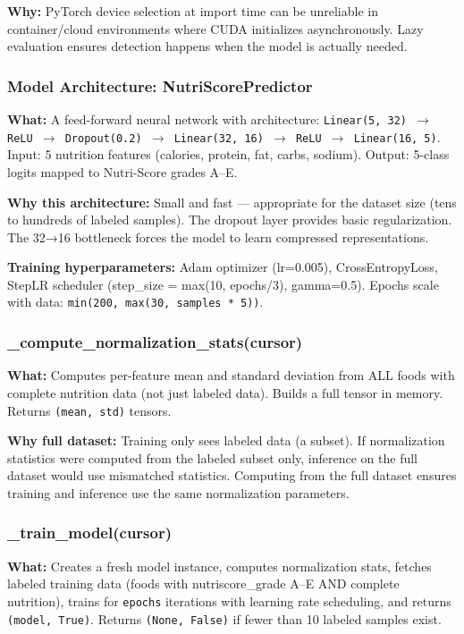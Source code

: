 \documentclass[12pt,a4paper]{article}
\begin{document}
\textbf{Why:} PyTorch device selection at import time can be unreliable in container/cloud environments where CUDA initializes asynchronously. Lazy evaluation ensures detection happens when the model is actually needed.

\subsubsection{Model Architecture: NutriScorePredictor}
\textbf{What:} A feed-forward neural network with architecture: \texttt{Linear(5, 32) $\rightarrow$ ReLU $\rightarrow$ Dropout(0.2) $\rightarrow$ Linear(32, 16) $\rightarrow$ ReLU $\rightarrow$ Linear(16, 5)}. Input: 5 nutrition features (calories, protein, fat, carbs, sodium). Output: 5-class logits mapped to Nutri-Score grades A–E.

\textbf{Why this architecture:} Small and fast — appropriate for the dataset size (tens to hundreds of labeled samples). The dropout layer provides basic regularization. The 32→16 bottleneck forces the model to learn compressed representations.

\textbf{Training hyperparameters:} Adam optimizer (lr=0.005), CrossEntropyLoss, StepLR scheduler (step\_size = max(10, epochs/3), gamma=0.5). Epochs scale with data: \texttt{min(200, max(30, samples * 5))}.

\subsubsection{\_compute\_normalization\_stats(cursor)}
\textbf{What:} Computes per-feature mean and standard deviation from ALL foods with complete nutrition data (not just labeled data). Builds a full tensor in memory. Returns \texttt{(mean, std)} tensors.

\textbf{Why full dataset:} Training only sees labeled data (a subset). If normalization statistics were computed from the labeled subset only, inference on the full dataset would use mismatched statistics. Computing from the full dataset ensures training and inference use the same normalization parameters.

\subsubsection{\_train\_model(cursor)}
\textbf{What:} Creates a fresh model instance, computes normalization stats, fetches labeled training data (foods with nutriscore\_grade A–E AND complete nutrition), trains for \texttt{epochs} iterations with learning rate scheduling, and returns \texttt{(model, True)}. Returns \texttt{(None, False)} if fewer than 10 labeled samples exist.
\end{document}
